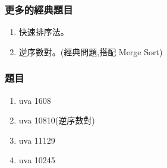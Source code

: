 \subsubsection{更多的經典題目}
\begin{enumerate}
\item 快速排序法。
\item 逆序數對。(經典問題,搭配 Merge Sort)
\end{enumerate}
\subsubsection{題目}
\begin{enumerate}
\item uva 1608
\item uva 10810(逆序數對)
\item uva 11129
\item uva 10245
\end{enumerate}
